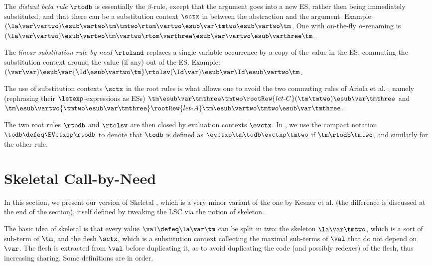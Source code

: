 The \emph{distant beta rule} $\rtodb$ is essentially the $\beta$-rule, except that the argument goes into a new ES, rather then being immediately substituted, and that there can be a substitution context $\sctx$ in between the abstraction and the argument. Example: $(\la\var\vartwo)\esub\vartwo\tm\tmtwo \rtom \vartwo\esub\var\tmtwo\esub\vartwo\tm$. One with on-the-fly $\alpha$-renaming is $(\la\var\vartwo)\esub\vartwo\tm\vartwo \rtom \varthree\esub\var\vartwo\esub\varthree\tm$.

The \emph{linear substitution rule by need} $\rtolsnd$ replaces a single variable occurrence by a copy of the value in the ES, commuting the substitution context around the value (if any) out of the ES. Example: $(\var\var)\esub\var{\Id\esub\vartwo\tm} \rtolsv (\Id\var)\esub\var\Id\esub\vartwo\tm$.

The use of substitution contexts $\sctx$ in the root rules is what allows one to avoid the two commuting rules of Ariola et al. \cite{DBLP:conf/popl/AriolaFMOW95}, namely (rephrasing their $\letexp$-expressions as ESs)
$\tm\esub\var\tmthree\tmtwo \rootRew{let\text{-}C} (\tm\tmtwo)\esub\var\tmthree$
 and $\tm\esub\vartwo{\tmtwo\esub\var\tmthree} \rootRew{let\text{-}A} \tm\esub\vartwo\tmtwo\esub\var\tmthree$.



The two root rules $\rtodb$ and $\rtolsv$ are then closed by evaluation contexts $\evctx$. In , we use the compact notation $\todb \defeq \EVctxsp\rtodb$ to denote that $\todb$ is defined as $\evctxp\tm \todb \evctxp\tmtwo$ if $\tm\rtodb\tmtwo$, and similarly for the other rule.





\section{Skeletal Call-by-Need}
\label{sect:skeletal}
In this section, we present our version of Skeletal \cbneed, which is a very minor variant of the one by Kesner et al. \cite{DBLP:journals/lmcs/KesnerPV24} (the difference is discussed at the end of the section), itself defined by tweaking the \cbneed LSC via the notion of skeleton.

The basic idea of skeletal \cbneed is that every value $\val\defeq \la\var\tm$ can be split in two: the skeleton $\la\var\tmtwo$, which is a sort of sub-term of $\tm$, and the flesh $\sctx$, which is a substitution context collecting the maximal sub-terms of $\val$ that do not depend on $\var$. The flesh is extracted from $\val$ before duplicating it, as to avoid duplicating the code (and possibly redexes) of the flesh, thus increasing sharing. Some definitions are in order.

